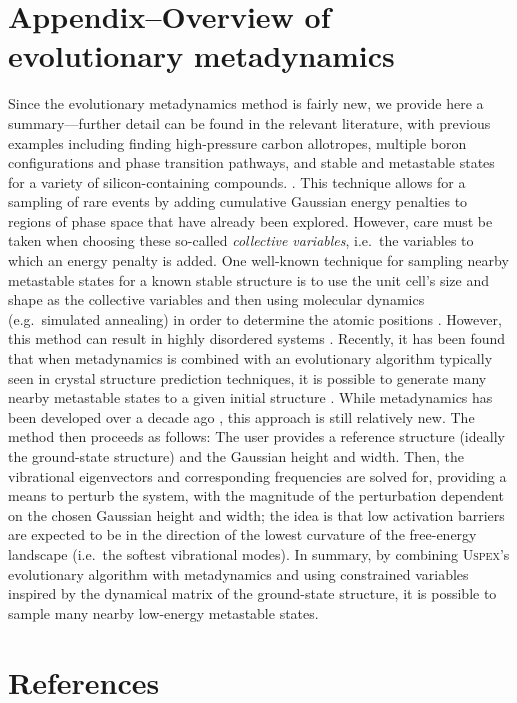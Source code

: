 \documentclass[twocolumn, prb, showpacs]{revtex4-1}
\begin{document}
\section*{Appendix--Overview of evolutionary metadynamics}
Since the evolutionary metadynamics method is fairly new, we provide
here a summary---further detail can be found in the relevant literature, with previous examples including
finding high-pressure carbon allotropes, multiple boron configurations and phase transition pathways, and stable and metastable states for a 
variety of silicon-containing compounds.
\cite{Zhu_2012:systematic_search,Zhu_2012:evolutionary_metadynamics,Zhu_2015:generalized_evolutionary}.
This technique allows for a sampling of rare events by adding cumulative Gaussian energy penalties to regions of phase space that have already been explored.
However, care must be taken when choosing these so-called \emph{collective variables},
i.e.\ the variables to which an energy penalty is added. One well-known technique
for sampling nearby metastable states for a known stable structure is to use the unit cell's
size and shape as the collective variables and then using molecular dynamics (e.g.\ simulated annealing)
in order to determine the atomic positions \cite{Marto-n-nak_2003:predicting_crystal}. However, this method can result
in highly disordered systems \cite{Zhu_2015:generalized_evolutionary}. Recently, it has been found that when metadynamics
is combined with an evolutionary algorithm typically seen in crystal structure
prediction techniques, it is possible to generate many nearby metastable states
to a given initial structure \cite{Zhu_2012:evolutionary_metadynamics,Zhu_2015:generalized_evolutionary}. While metadynamics has been developed
over a
decade ago \cite{Laio_2002:escaping_free-energy}, this approach is still relatively new. The method then proceeds as follows: The user
provides a reference structure (ideally the ground-state structure) and the 
Gaussian height and width. Then, the vibrational eigenvectors and corresponding frequencies
are solved for, providing a means to perturb the system, with the magnitude of the perturbation
dependent on the chosen Gaussian height and width; the idea is that low activation barriers
are expected to be in the direction of the lowest curvature of the free-energy landscape (i.e.\
the softest vibrational modes). In summary, by combining \textsc{Uspex}'s evolutionary algorithm with metadynamics and using
constrained variables inspired by the dynamical matrix of the ground-state structure, it is possible to sample
many nearby low-energy metastable states.


\section*{References}





\end{document}
